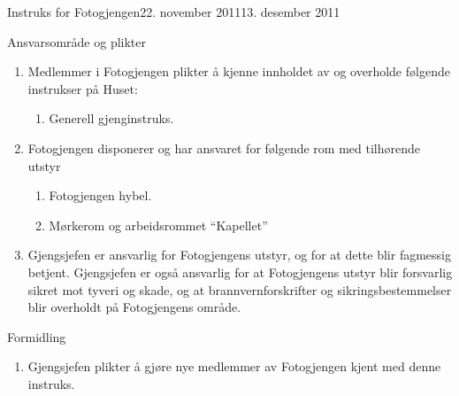 \begin{instruks*}{Instruks for Fotogjengen}{22. november 2011}{13. desember 2011}
    \begin{instruksledd}{Ansvarsområde og plikter}
        \begin{enumerate}
            \item Medlemmer i Fotogjengen plikter å kjenne innholdet av og overholde følgende instrukser
                på Huset:
                \begin{enumerate}
                    \item Generell gjenginstruks.
                \end{enumerate}
            \item Fotogjengen disponerer og har ansvaret for følgende rom med tilhørende utstyr
                \begin{enumerate}
                    \item Fotogjengen hybel.
                    \item Mørkerom og arbeidsrommet ``Kapellet''
                \end{enumerate}
            \item Gjengsjefen er ansvarlig for Fotogjengens utstyr, og for at dette blir fagmessig
                betjent. Gjengsjefen er også ansvarlig for at Fotogjengens utstyr blir forsvarlig sikret mot tyveri og skade, og at
                brannvernforskrifter og sikringsbestemmelser blir overholdt på Fotogjengens område.
        \end{enumerate}
    \end{instruksledd}
    
    \begin{instruksledd}{Formidling}
        \begin{enumerate}
            \item Gjengsjefen plikter å gjøre nye medlemmer av Fotogjengen kjent med denne
                instruks.
        \end{enumerate}
    \end{instruksledd}

\end{instruks*}

